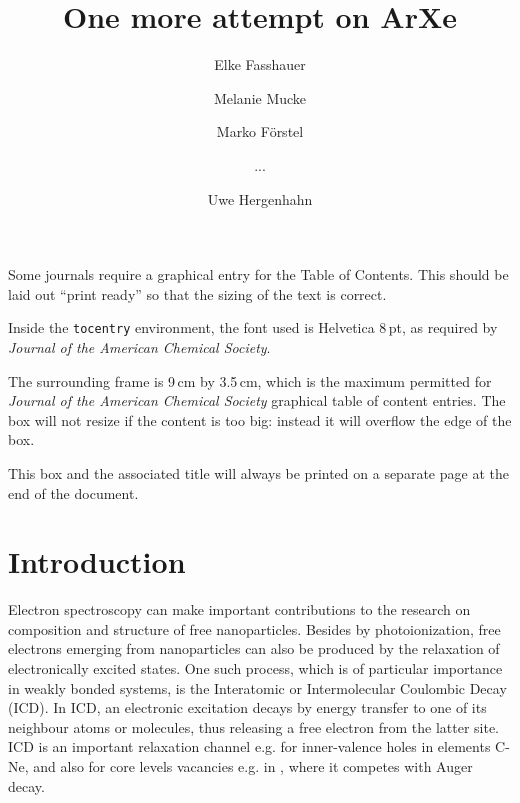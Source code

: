 \documentclass[journal=jpccck,manuscript=article,layout=twocolumn]{achemso}
\author{Elke Fasshauer}
\affiliation[UIT]{Tromso, Norway}
\author{Melanie Mucke}
\author{Marko F\"orstel}
\affiliation[IPP]{Max-Planck-Institute for Plasma Physics, Boltzmannstr. 2, 85748 Garching, Germany}
\author{...}
\author{Uwe Hergenhahn}
\affiliation[IPP HGW]{Max-Planck-Institute for Plasma Physics, Wendelsteinstr. 1, 14791 Greifswald, Germany}
\title{One more attempt on ArXe}
\begin{document}
\begin{tocentry}

Some journals require a graphical entry for the Table of Contents.
This should be laid out ``print ready'' so that the sizing of the
text is correct.

Inside the \texttt{tocentry} environment, the font used is Helvetica
8\,pt, as required by \emph{Journal of the American Chemical
Society}.

The surrounding frame is 9\,cm by 3.5\,cm, which is the maximum
permitted for  \emph{Journal of the American Chemical Society}
graphical table of content entries. The box will not resize if the
content is too big: instead it will overflow the edge of the box.

This box and the associated title will always be printed on a
separate page at the end of the document.

\end{tocentry}

\begin{abstract}
\end{abstract}

\section{Introduction}
%
Electron spectroscopy can make important contributions to the research on composition and structure of free nanoparticles.\cite{jpcc} Besides by photoionization, free electrons emerging from nanoparticles can also be produced by the relaxation of electronically excited states. One such process, which is of particular importance in weakly bonded systems, is the Interatomic or Intermolecular Coulombic Decay (ICD).\cite{cederbaum} In ICD, an electronic excitation decays by energy transfer to one of its neighbour atoms or molecules, thus releasing a free electron from the latter site. ICD is an important relaxation channel e.g. for inner-valence holes in elements C-Ne, and also for core levels vacancies e.g. in , where it competes with Auger decay\cite{slavicek}. 
\end{document}
